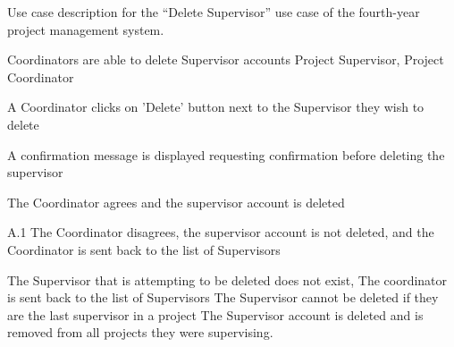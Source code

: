 \documentclass[document.tex]{subfiles}
\begin{document}
\begin{table}
  \centering
  \caption{Use case description for the ``Delete Supervisor'' use case of the fourth-year project management system.}
  \label{tbl:use-case-delete-supervisor}

  \begin{usecase}
    Coordinators are able to delete Supervisor accounts
    Project Supervisor, Project Coordinator
    \ucnormal
    \begin{ucenum}
      \item A Coordinator clicks on 'Delete' button next to the Supervisor they wish to delete
      \item A confirmation message is displayed requesting confirmation before deleting the supervisor
      \item The Coordinator agrees and the supervisor account is deleted
    \end{ucenum}
    \begin{ucenum*}
      \item [A.1] The Coordinator disagrees, the supervisor account is not deleted, and the Coordinator is sent back to the list of Supervisors
    \end{ucenum*}
    The Supervisor that is attempting to be deleted does not exist, The coordinator is sent back to the list of Supervisors
    The Supervisor cannot be deleted if they are the last supervisor in a project
    The Supervisor account is deleted and is removed from all projects they were supervising.
  \end{usecase}
\end{table}
\end{document}
